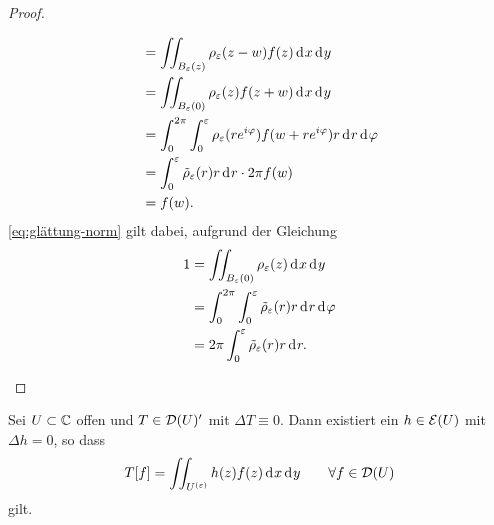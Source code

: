 \begin{proof}
\begin{enumerate}
\begin{align}
      & = \iint_{B_\epsilon(z)} \rho_\epsilon(z -w ) f(z) \d[x]\d[y]
      \nonumber \\
      & = \iint_{B_\epsilon(0)} \rho_\epsilon(z) f(z + w) \d[x]\d[y]
      \nonumber \\
      & = \int_0^{2\pi} \int_0^\epsilon \rho_\epsilon(re^{i\phi}) f(w +
       re^{i\phi}) r \d[r] \d[\phi] \nonumber \\
      & = \int_0^\epsilon \tilde \rho_\epsilon(r) r\d[r] \cdot 2 \pi
      f(w) \nonumber \\
      & = f(w). \label{eq:glättung-norm} 
    \end{align}
    \eqref{eq:glättung-norm} gilt dabei, aufgrund der Gleichung
    \begin{align*}
      1 & = \iint_{B_\epsilon(0)}\rho_\epsilon(z) \d[x]\d[y] \\
      & = \int_0^{2\pi}\int_0^{\epsilon} \tilde \rho_\epsilon(r) r
      \d[r] \d[\phi] \\
      & = 2 \pi \int_0^\epsilon \tilde \rho_\epsilon(r) r \d[r].
    \end{align*}
  \end{enumerate}
\end{proof}

\begin{thm}
  \label{thm:weyl}
  Sei $U \subset \mathbb{C}$ offen und $T \in \mathcal{D}(U)'$ mit $\Delta T \equiv
  0$. 
  Dann existiert ein $h \in \mathcal{E}(U)$ mit $\Delta h = 0$, so dass
  \[T[f] = \iint_{U^{(\epsilon)}} h(z) f(z) \d[x]\d[y] \qquad \forall f \in \dist(U)
  \]
  gilt.
\end{thm}

